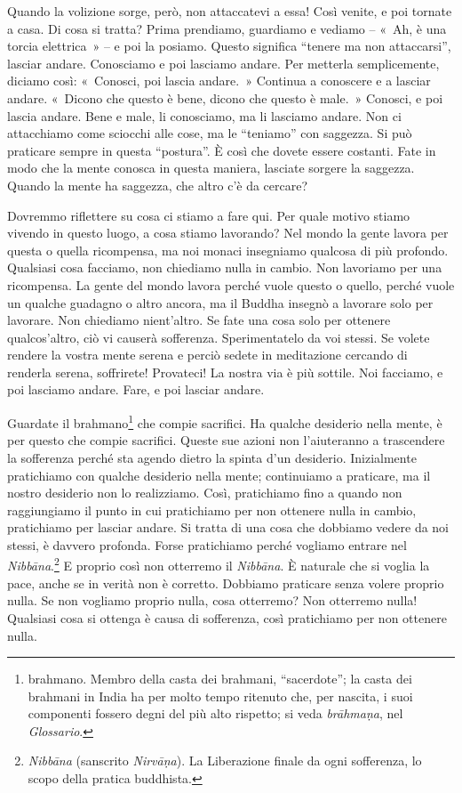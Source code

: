 Quando la volizione sorge, però, non attaccatevi a essa! Così venite, e
poi tornate a casa. Di cosa si tratta? Prima prendiamo, guardiamo e
vediamo -- «~Ah, è una torcia elettrica~» -- e poi la posiamo. Questo
significa ``tenere ma non attaccarsi'', lasciar andare. Conosciamo e poi
lasciamo andare. Per metterla semplicemente, diciamo così: «~Conosci,
poi lascia andare.~» Continua a conoscere e a lasciar andare. «~Dicono
che questo è bene, dicono che questo è male.~» Conosci, e poi lascia
andare. Bene e male, li conosciamo, ma li lasciamo andare. Non ci
attacchiamo come sciocchi alle cose, ma le ``teniamo'' con saggezza. Si
può praticare sempre in questa ``postura''. È così che dovete essere
costanti. Fate in modo che la mente conosca in questa maniera, lasciate
sorgere la saggezza. Quando la mente ha saggezza, che altro c'è da
cercare?

Dovremmo riflettere su cosa ci stiamo a fare qui. Per quale motivo
stiamo vivendo in questo luogo, a cosa stiamo lavorando? Nel mondo la
gente lavora per questa o quella ricompensa, ma noi monaci insegniamo
qualcosa di più profondo. Qualsiasi cosa facciamo, non chiediamo nulla
in cambio. Non lavoriamo per una ricompensa. La gente del mondo lavora
perché vuole questo o quello, perché vuole un qualche guadagno o altro
ancora, ma il Buddha insegnò a lavorare solo per lavorare. Non chiediamo
nient'altro. Se fate una cosa solo per ottenere qualcos'altro, ciò vi
causerà sofferenza. Sperimentatelo da voi stessi. Se volete rendere la
vostra mente serena e perciò sedete in meditazione cercando di renderla
serena, soffrirete! Provateci! La nostra via è più sottile. Noi
facciamo, e poi lasciamo andare. Fare, e poi lasciar andare.

Guardate il brahmano\footnote{brahmano. Membro della casta dei brahmani,
  ``sacerdote''; la casta dei brahmani in India ha per molto tempo
  ritenuto che, per nascita, i suoi componenti fossero degni del più
  alto rispetto; si veda \emph{brāhmaṇa}, nel \emph{Glossario}.} che
compie sacrifici. Ha qualche desiderio nella mente, è per questo che
compie sacrifici. Queste sue azioni non l'aiuteranno a trascendere la
sofferenza perché sta agendo dietro la spinta d'un desiderio.
Inizialmente pratichiamo con qualche desiderio nella mente; continuiamo
a praticare, ma il nostro desiderio non lo realizziamo. Così,
pratichiamo fino a quando non raggiungiamo il punto in cui pratichiamo
per non ottenere nulla in cambio, pratichiamo per lasciar andare. Si
tratta di una cosa che dobbiamo vedere da noi stessi, è davvero
profonda. Forse pratichiamo perché vogliamo entrare nel
\emph{Nibbāna}.\footnote{\emph{Nibbāna} (sanscrito \emph{Nirvāṇa}). La
  Liberazione finale da ogni sofferenza, lo scopo della pratica
  buddhista.} E proprio così non otterremo il \emph{Nibbāna}. È naturale
che si voglia la pace, anche se in verità non è corretto. Dobbiamo
praticare senza volere proprio nulla. Se non vogliamo proprio nulla,
cosa otterremo? Non otterremo nulla! Qualsiasi cosa si ottenga è causa
di sofferenza, così pratichiamo per non ottenere nulla.

